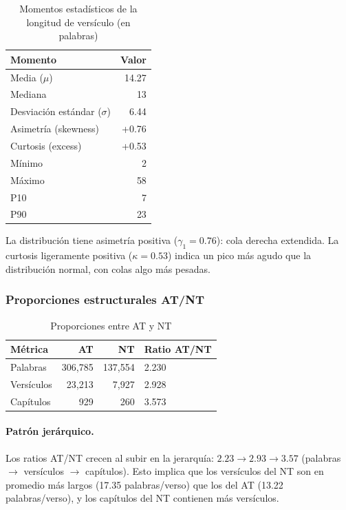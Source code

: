 \documentclass[12pt,a4paper]{article}
\newcommand{\ot}{\textcolor{otcolor}{\textbf{AT}}}
\newcommand{\nt}{\textcolor{ntcolor}{\textbf{NT}}}
\begin{document}
\begin{table}[H]
\centering
\caption{Momentos estad\'isticos de la longitud de vers\'iculo (en palabras)}
\label{tab:verselen}
\begin{tabular}{lr}
\toprule
\textbf{Momento} & \textbf{Valor} \\
\midrule
Media ($\mu$)         & 14.27 \\
Mediana               & 13 \\
Desviaci\'on est\'andar ($\sigma$) & 6.44 \\
Asimetr\'ia (skewness)  & +0.76 \\
Curtosis (excess)       & +0.53 \\
M\'inimo               & 2 \\
M\'aximo               & 58 \\
P10                     & 7 \\
P90                     & 23 \\
\bottomrule
\end{tabular}
\end{table}

La distribuci\'on tiene asimetr\'ia positiva ($\gamma_1 = 0.76$): cola derecha extendida.
La curtosis ligeramente positiva ($\kappa = 0.53$) indica un pico m\'as agudo que
la distribuci\'on normal, con colas algo m\'as pesadas.

\subsubsection{Proporciones estructurales AT/NT}

\begin{table}[H]
\centering
\caption{Proporciones entre AT y NT}
\label{tab:proportions}
\begin{tabular}{lrrl}
\toprule
\textbf{M\'etrica} & \textbf{\ot{}} & \textbf{\nt{}} & \textbf{Ratio AT/NT} \\
\midrule
Palabras     & 306,785 & 137,554 & 2.230 \\
Vers\'iculos & 23,213  &   7,927 & 2.928 \\
Cap\'itulos  &    929  &     260 & 3.573 \\
\bottomrule
\end{tabular}
\end{table}

\paragraph{Patr\'on jer\'arquico.}
Los ratios AT/NT crecen al subir en la jerarqu\'ia:
$2.23 \to 2.93 \to 3.57$ (palabras $\to$ vers\'iculos $\to$ cap\'itulos).
Esto implica que los vers\'iculos del NT son en promedio m\'as largos
(17.35 palabras/verso) que los del AT (13.22 palabras/verso), y los cap\'itulos
del NT contienen m\'as vers\'iculos.
\end{document}
